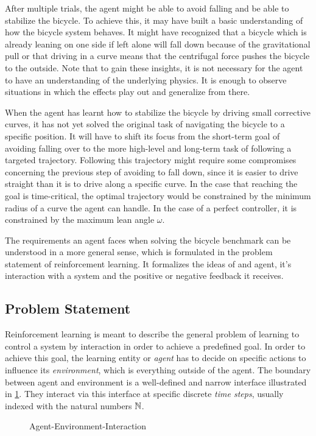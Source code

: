 After multiple trials, the agent might be able to avoid falling and be able to stabilize the bicycle.
To achieve this, it may have built a basic understanding of how the bicycle system behaves.
It might have recognized that a bicycle which is already leaning on one side if left alone will fall down because of the gravitational pull or that driving in a curve means that the centrifugal force pushes the bicycle to the outside.
Note that to gain these insights, it is not necessary for the agent to have an understanding of the underlying physics.
It is enough to observe situations in which the effects play out and generalize from there.

When the agent has learnt how to stabilize the bicycle by driving small corrective curves, it has not yet solved the original task of navigating the bicycle to a specific position.
It will have to shift its focus from the short-term goal of avoiding falling over to the more high-level and long-term task of following a targeted trajectory.
Following this trajectory might require some compromises concerning the previous step of avoiding to fall down, since it is easier to drive straight than it is to drive along a specific curve.
In the case that reaching the goal is time-critical, the optimal trajectory would be constrained by the minimum radius of a curve the agent can handle.
In the case of a perfect controller, it is constrained by the maximum lean angle $\omega$.

The requirements an agent faces when solving the bicycle benchmark can be understood in a more general sense, which is formulated in the problem statement of reinforcement learning.
It formalizes the ideas of and agent, it's interaction with a system and the positive or negative feedback it receives.

\subsection{Problem Statement}
Reinforcement learning is meant to describe the general problem of learning to control a system by interaction in order to achieve a predefined goal.
In order to achieve this goal, the learning entity or \emph{agent} has to decide on specific actions to influence its \emph{environment}, which is everything outside of the agent.
The boundary between agent and environment is a well-defined and narrow interface illustrated in \cref{fig:agent_environment_interaction}.
They interact via this interface at specific discrete \emph{time steps}, usually indexed with the natural numbers $\mathbb{N}$.
\begin{figure}[htb]
    \centering
    \caption{Agent-Environment-Interaction}
    \label{fig:agent_environment_interaction}
\end{figure}

